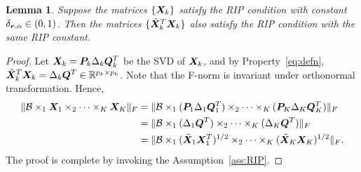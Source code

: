 \documentclass[11pt]{article}
\theoremstyle{plain}
\newtheorem{lem}{Lemma}
\theoremstyle{definition}
\begin{document}
\begin{lem}\label{lemma:RIP}
Suppose the matrices $\{\bm X_k\}$ satisfy the RIP condition with constant $\delta_{\bm{r},\alpha}\in(0,1)$. Then the matrices $\{ \tilde {\bm X}^T_k\bm X_k \}$ also satisfy the RIP condition with the same RIP constant. 
\end{lem}
\begin{proof}
Let $\bm X_k=\bm{P}_k\Delta_k \bm{Q}^T_k$ be the SVD of $\bm X_k$, and by Property~\ref{eq:defn}, $\tilde{\bm X}^T_k\bm X_k=\Delta_k\bm{Q}^T\in\mathbb{R}^{p_k\times p_k}$. Note that the F-norm is invariant under orthonormal transformation. Hence,
\begin{align}
\lVert\mathcal{B}\times_1\bm X_1\times_2\cdots\times_K\bm X_K\rVert_F&=\lVert\mathcal{B}\times_1(\bm{P}_1\Delta_1\bm{Q}^T_1)\times_2\cdots\times_K(\bm{P}_K\Delta_K\bm{Q}^T_K)\rVert_F\\
&=\lVert\mathcal{B}\times_1 (\Delta_1\bm{Q}^T)\times_2\cdots\times_K(\Delta_K\bm{Q}^T)\rVert_F\\
&=\lVert\mathcal{B}\times_1 (\tilde {\bm X}_1\bm X^T_1)^{1/2}\times_2\cdots\times_K (\tilde {\bm X}_K\bm X_K)^{1/2} \rVert_F.
\end{align}
The proof is complete by invoking the Assumption~\ref{ass:RIP}.
\end{proof}
\end{document}
